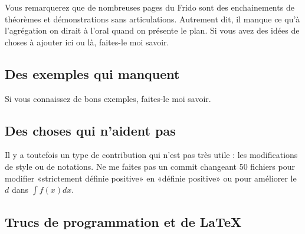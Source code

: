 Vous remarquerez que de nombreuses pages du Frido sont des enchainements de théorèmes et démonstrations sans articulations. Autrement dit, il manque ce qu'à l'agrégation on dirait à l'oral quand on présente le plan. Si vous avez des idées de choses à ajouter ici ou là, faites-le moi savoir.

\subsection{Des exemples qui manquent}
\label{SUBooINTROhowtoContribExamples}

Si vous connaissez de bons exemples, faites-le moi savoir.


\subsection{Des choses qui n'aident pas}

Il y a toutefois un type de contribution qui n'est pas très utile : les modifications de style ou de notations. Ne me faites pas un commit changeant 50 fichiers pour modifier «strictement définie positive» en «définie positive» ou pour améliorer le \( d\) dans \( \int f(x)dx\).

\subsection{Trucs de programmation et de \LaTeX}
\label{SUBooINTROhowtoContribProg}

